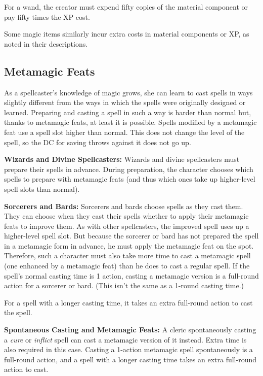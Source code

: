 For a wand, the creator must expend fifty copies of the material component or pay 
fifty times the XP cost.

Some magic items similarly incur extra costs in material components or XP, as noted 
in their descriptions.

\subsection{Metamagic Feats}

As a spellcaster's knowledge of magic grows, she can learn to cast spells in ways 
slightly different from the ways in which the spells were originally designed or 
learned. Preparing and casting a spell in such a way is harder than normal but, 
thanks to metamagic feats, at least it is possible.  Spells modified by a metamagic 
feat use a spell slot higher than normal. This does not change the level of the 
spell, so the DC for saving throws against it does not go up.

\textbf{Wizards and Divine Spellcasters:} Wizards and divine spellcasters must 
prepare their spells in advance. During preparation, the character chooses which 
spells to prepare with metamagic feats (and thus which ones take up higher-level 
spell slots than normal).

\textbf{Sorcerers and Bards:} Sorcerers and bards choose spells as they cast them. 
They can choose when they cast their spells whether to apply their metamagic feats 
to improve them. As with other spellcasters, the improved spell uses up a higher-level 
spell slot. But because the sorcerer or bard has not prepared the spell in a metamagic 
form in advance, he must apply the metamagic feat on the spot. Therefore, such 
a character must also take more time to cast a metamagic spell (one enhanced by 
a metamagic feat) than he does to cast a regular spell. If the spell's normal casting 
time is 1 action, casting a metamagic version is a full-round action for a sorcerer 
or bard. (This isn't the same as a 1-round casting time.)

For a spell with a longer casting time, it takes an extra full-round action to 
cast the spell.

\textbf{Spontaneous Casting and Metamagic Feats:} A cleric spontaneously casting 
a \textit{cure} or \textit{inflict} spell can cast a metamagic version of it instead. 
Extra time is also required in this case. Casting a 1-action metamagic spell spontaneously 
is a full-round action, and a spell with a longer casting time takes an extra full-round 
action to cast.

